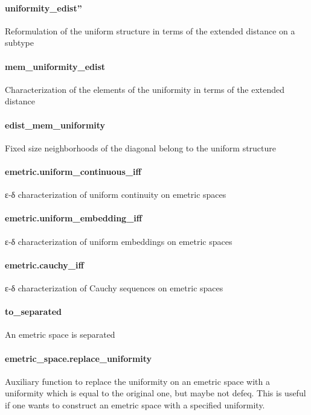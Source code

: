 \documentclass{article}
\begin{document}
\paragraph{uniformity\_edist''}
\par
Reformulation of the uniform structure in terms of the extended distance on a subtype
\paragraph{mem\_uniformity\_edist}
\par
Characterization of the elements of the uniformity in terms of the extended distance
\paragraph{edist\_mem\_uniformity}
\par
Fixed size neighborhoods of the diagonal belong to the uniform structure
\paragraph{emetric.uniform\_continuous\_iff}
\par
ε-δ characterization of uniform continuity on emetric spaces
\paragraph{emetric.uniform\_embedding\_iff}
\par
ε-δ characterization of uniform embeddings on emetric spaces
\paragraph{emetric.cauchy\_iff}
\par
ε-δ characterization of Cauchy sequences on emetric spaces
\paragraph{to\_separated}
\par
An emetric space is separated
\paragraph{emetric\_space.replace\_uniformity}
\par
Auxiliary function to replace the uniformity on an emetric space with
a uniformity which is equal to the original one, but maybe not defeq.
This is useful if one wants to construct an emetric space with a
specified uniformity.
\end{document}
